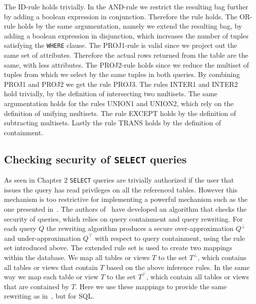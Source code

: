 The ID-rule holds trivially.
%
In the AND-rule we restrict the resulting bag further by adding a boolean expression in conjunction. 
%
Therefore the rule holds.
%
The OR-rule holds by the same argumentation, namely we extend the resulting bag, by adding a boolean expression in disjunction,  which increases the number of tuples satisfying the \texttt{WHERE} clause. 
%
The PROJ1-rule is valid since we project out the same set of attributes. Therefore the actual rows returned from the table are the same, with less attributes.
%
%
The PROJ2-rule holds since we reduce the multiset of tuples from which we select by the same tuples in both queries.
%
By combining PROJ1 and PROJ2 we get the rule PROJ3.
%
The rules INTER1 and INTER2 hold trivially, by the definition of intersecting two multisets.
%
The same argumentation holds for the rules UNION1 and UNION2, which rely on the definition of unifying multisets.
%
The rule EXCEPT holds by the definition of subtracting multisets.
%
Lastly the rule TRANS holds by the definition of containment.

\FloatBarrier
\subsection{Checking security of \texttt{SELECT} queries}

As seen in Chapter 2 \texttt{SELECT} queries are trivially authorized  if the user that issues the query has read privileges on all the referenced tables.
%
However this mechanism is too restrictive for implementing a powerful mechanism such as the one presented in~\cite{guarnieri2016strong}.
%
The authors of~\cite{guarnieri2016strong} have developed an algorithm that checks the security of queries, which relies on query containment and query rewriting. 
%
For each query $Q$ the rewriting algorithm produces a secure over-approximation $Q^\bot$ and under-approximation $Q^\top$ with respect to query containment, using the rule set introduced above. 
%
%
The extended rule set is used to create two mappings within the database.
%
We map all tables or views $T$ to the set $T^\bot$, which contains all tables or views that contain $T$ based on the above inference rules.
%
In the same way we map each table or view $T$ to the set $T^\top$, which contain all tables or views that are contained by $T$.
%
Here we use these mappings to provide the same rewriting as in~\cite{guarnieri2016strong}, but for SQL.

